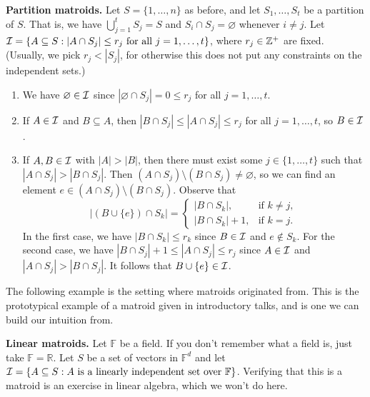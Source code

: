 {\bf Partition matroids.} Let $S = \{1, \dots, n\}$ as before, and 
let $S_1, \dots, S_t$ be a partition of $S$. That is, we have 
$\bigcup_{j=1}^t S_j = S$ and $S_i \cap S_j = \varnothing$ whenever 
$i \neq j$. Let ${\cal I} = \{A \subseteq S : |A \cap S_j| \leq r_j 
\text{ for all } j = 1, \dots, t\}$, where $r_j \in \mathbb{Z}^+$ are fixed. 
(Usually, we pick $r_j < |S_j|$, for otherwise this does not put 
any constraints on the independent sets.)
\begin{enumerate}[(1)]
    \item We have $\varnothing \in {\cal I}$ since $|\varnothing \cap S_j| =
    0 \leq r_j$ for all $j = 1, \dots, t$. 
    \item If $A \in {\cal I}$ and $B \subseteq A$, then $|B \cap S_j| 
    \leq |A \cap S_j| \leq r_j$ for all $j = 1, \dots, t$, so $B \in {\cal I}$.
    \item If $A, B \in {\cal I}$ with $|A| > |B|$, then there must exist 
    some $j \in \{1, \dots, t\}$ such that $|A \cap S_j| > |B \cap S_j|$. 
    Then $(A \cap S_j) \setminus (B \cap S_j) \neq \varnothing$, so 
    we can find an element $e \in (A \cap S_j) \setminus (B \cap S_j)$. 
    Observe that 
    \[ |(B \cup \{e\}) \cap S_k| = \begin{cases}
        |B \cap S_k|, & \text{if } k \neq j, \\ 
        |B \cap S_k| + 1, & \text{if } k = j. 
    \end{cases} \] 
    In the first case, we have $|B \cap S_k| \leq r_k$ since $B \in {\cal I}$
    and $e \notin S_k$. For the second case, we have $|B \cap S_j| + 1 
    \leq |A \cap S_j| \leq r_j$ since $A \in {\cal I}$ and 
    $|A \cap S_j| > |B \cap S_j|$. It follows that 
    $B \cup \{e\} \in {\cal I}$. 
\end{enumerate}

The following example is the setting where matroids originated from. 
This is the prototypical example of a matroid given in introductory
talks, and is one we can build our intuition from. 

{\bf Linear matroids.} Let $\mathbb{F}$ be a field. If you don't remember 
what a field is, just take $\mathbb{F} = \mathbb{R}$. 
Let $S$ be a set of vectors in $\mathbb{F}^d$ and let 
${\cal I} = \{A \subseteq S : A \text{ is a linearly independent set over }
\mathbb{F}\}$. Verifying that this is a matroid is an exercise in 
linear algebra, which we won't do here.

